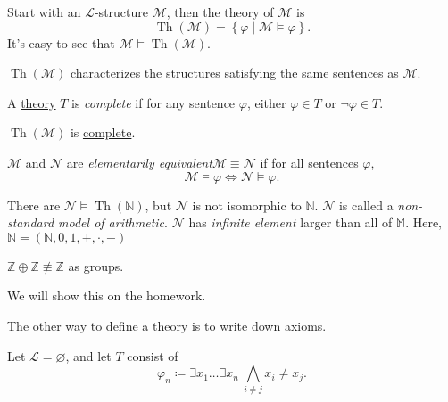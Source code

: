 Start with an \(\mathcal{L} \)-structure \(\mathcal{M} \), then the theory of \(\mathcal{M} \) is
\[
	\mathop{\mathrm{Th}}(\mathcal{M} ) = \left\{ \varphi \mid \mathcal{M} \models \varphi  \right\}.
\]
It's easy to see that \(\mathcal{M} \models \mathop{\mathrm{Th}}(\mathcal{M} ) \).

\begin{remark}
	\(\mathop{\mathrm{Th}}(\mathcal{M} ) \) characterizes the structures satisfying the same sentences as \(\mathcal{M} \).
\end{remark}


\begin{definition}[Complete]\label{def:complete}
	A \hyperref[def:theory]{theory} \(T\) is \emph{complete} if for any sentence \(\varphi \), either \(\varphi \in T\) or \(\lnot \varphi \in T\).
\end{definition}

\begin{remark}
	\(\mathop{\mathrm{Th}}(\mathcal{M} ) \) is \hyperref[def:complete]{complete}.
\end{remark}

\begin{definition}\label{def:elementarily-equivalent}
	\(\mathcal{M} \) and \(\mathcal{N} \) are \emph{elementarily equivalent}\(\mathcal{M} \equiv \mathcal{N} \) if for all sentences \(\varphi \),
	\[
		\mathcal{M} \models \varphi \iff \mathcal{N} \models \varphi .
	\]
\end{definition}

\begin{remark}
	There are \(\mathcal{N} \models \mathop{\mathrm{Th}}(\mathbb{N})\), but \(\mathcal{N} \) is not isomorphic to \(\mathbb{N} \). \(\mathcal{N} \) is called a \emph{non-standard model of arithmetic}. \(\mathcal{N} \) has \emph{infinite element} larger than all of \(\mathbb{M} \). Here, \(\mathbb{N} =(\mathbb{N} , 0, 1, +, \cdot, - )\)
\end{remark}

\begin{eg}
	\(\mathbb{Z} \oplus \mathbb{Z} \not\equiv \mathbb{Z} \) as groups.
\end{eg}
\begin{explanation}
	We will show this on the homework.
\end{explanation}

The other way to define a \hyperref[def:theory]{theory} is to write down axioms.

\begin{eg}
	Let \(\mathcal{L} = \varnothing \), and let \(T\) consist of
	\[
		\varphi _n \coloneqq \exists x_1 \ldots \exists x_n\ \bigwedge _{i \neq j} x_i \neq x_j.
	\]
\end{eg}

